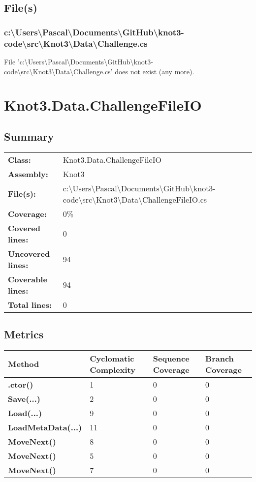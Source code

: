 \documentclass[a4paper,10pt]{article}
\begin{document}
\subsection{File(s)}
\subsubsection{c:\textbackslash Users\textbackslash Pascal\textbackslash Documents\textbackslash GitHub\textbackslash knot3-code\textbackslash src\textbackslash Knot3\textbackslash Data\textbackslash Challenge.cs}
 File 'c:\textbackslash Users\textbackslash Pascal\textbackslash Documents\textbackslash GitHub\textbackslash knot3-code\textbackslash src\textbackslash Knot3\textbackslash Data\textbackslash Challenge.cs' does not exist (any more).
\newpage
\section{Knot3.Data.ChallengeFileIO}
\subsection{Summary}
\begin{longtable}[l]{ll}
\textbf{Class:} & Knot3.Data.ChallengeFileIO\\
\textbf{Assembly:} & Knot3\\
\textbf{File(s):} & \begin{minipage}[t]{12cm}{c:\textbackslash Users\textbackslash Pascal\textbackslash Documents\textbackslash GitHub\textbackslash knot3-code\textbackslash src\textbackslash Knot3\textbackslash Data\textbackslash ChallengeFileIO.cs}\end{minipage} \\
\textbf{Coverage:} & 0\%\\
\textbf{Covered lines:} & 0\\
\textbf{Uncovered lines:} & 94\\
\textbf{Coverable lines:} & 94\\
\textbf{Total lines:} & 0\\
\end{longtable}
\subsection{Metrics}
\begin{longtable}[l]{|l|l|l|l|}
\hline
\textbf{Method} & \textbf{Cyclomatic Complexity} & \textbf{Sequence Coverage} & \textbf{Branch Coverage}\\
\hline
\textbf{.ctor()} & 1 & 0 & 0\\
\hline
\textbf{Save(...)} & 2 & 0 & 0\\
\hline
\textbf{Load(...)} & 9 & 0 & 0\\
\hline
\textbf{LoadMetaData(...)} & 11 & 0 & 0\\
\hline
\textbf{MoveNext()} & 8 & 0 & 0\\
\hline
\textbf{MoveNext()} & 5 & 0 & 0\\
\hline
\textbf{MoveNext()} & 7 & 0 & 0\\
\hline
\end{longtable}
\end{document}
